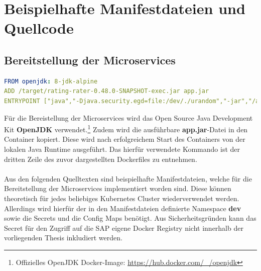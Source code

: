 \newpage

\section{Beispielhafte Manifestdateien und Quellcode}
\subsection{Bereitstellung der Microservices}
\begin{lstlisting}[language=yaml, caption=Dockerfile des Rater-Microservices, label=quellcode_bereitstellung_microservices]
FROM openjdk: 8-jdk-alpine
ADD /target/rating-rater-0.48.0-SNAPSHOT-exec.jar app.jar
ENTRYPOINT ["java","-Djava.security.egd=file:/dev/./urandom","-jar","/app.jar"]
\end{lstlisting}
Für die Bereistellung der Microservices wird das Open Source Java Development Kit \textbf{OpenJDK} verwendet.\footnote{Offizielles OpenJDK Docker-Image: \url{https://hub.docker.com/_/openjdk}}
Zudem wird die ausführbare \textbf{app.jar}-Datei in den Container kopiert. Diese wird nach erfolgreichem Start des Containers von der lokalen Java Runtime ausgeführt. Das hierfür verwendete Kommando ist der dritten Zeile des zuvor dargestellten Dockerfiles zu entnehmen.\\
\\
Aus den folgenden Quelltexten sind beispielhafte Manifestdateien, welche für die Bereitstellung der Microservices implementiert worden sind. Diese können theoretisch für jedes beliebiges Kubernetes Cluster wiederverwendet werden. Allerdings wird hierfür der in den Manifestdateien definierte Namespace \textbf{dev} sowie die Secrets und die Config Maps benötigt. Aus Sicherheitsgründen kann das Secret für den Zugriff auf die SAP eigene Docker Registry nicht innerhalb der vorliegenden Thesis inkludiert werden.
\\

\newpage


\newpage

\newpage

\newpage
